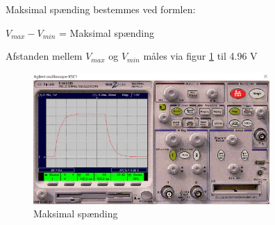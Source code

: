 Maksimal spænding bestemmes ved formlen:
\begin{center}
$V_{max} - V_{min}$ = Maksimal spænding
\end{center}


Afstanden mellem $V_{max}$ og $V_{min}$ måles via figur \ref{100k.5Hz.min.max} til 4.96 V
\begin{figure}[h]
 \begin{center}
  \includegraphics[height=5cm]{P_Fig/figur5_100k_5Hz_min_max.png}
  \caption{Maksimal spænding}
  \label{100k.5Hz.min.max}
 \end{center}
\end{figure}
